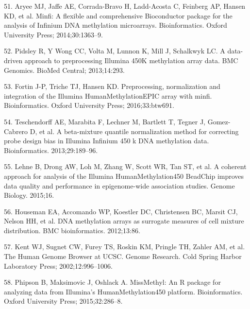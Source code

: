 \documentclass[]{bmcart}
\theoremstyle{definition}
\theoremstyle{definition}
\theoremstyle{definition}
\theoremstyle{remark}
\begin{document}
51. Aryee MJ, Jaffe AE, Corrada-Bravo H, Ladd-Acosta C, Feinberg AP,
Hansen KD, et al. Minfi: A flexible and comprehensive Bioconductor
package for the analysis of Infinium DNA methylation microarrays.
Bioinformatics. Oxford University Press; 2014;30:1363--9.

52. Pidsley R, {Y Wong} CC, Volta M, Lunnon K, Mill J, Schalkwyk LC. A
data-driven approach to preprocessing Illumina 450K methylation array
data. BMC Genomics. BioMed Central; 2013;14:293.

53. Fortin J-P, Triche TJ, Hansen KD. Preprocessing, normalization and
integration of the Illumina HumanMethylationEPIC array with minfi.
Bioinformatics. Oxford University Press; 2016;33:btw691.

54. Teschendorff AE, Marabita F, Lechner M, Bartlett T, Tegner J,
Gomez-Cabrero D, et al. A beta-mixture quantile normalization method for
correcting probe design bias in Illumina Infinium 450 k DNA methylation
data. Bioinformatics. 2013;29:189--96.

55. Lehne B, Drong AW, Loh M, Zhang W, Scott WR, Tan ST, et al. A
coherent approach for analysis of the Illumina HumanMethylation450
BeadChip improves data quality and performance in epigenome-wide
association studies. Genome Biology. 2015;16.

56. Houseman EA, Accomando WP, Koestler DC, Christensen BC, Marsit CJ,
Nelson HH, et al. DNA methylation arrays as surrogate measures of cell
mixture distribution. BMC bioinformatics. 2012;13:86.

57. Kent WJ, Sugnet CW, Furey TS, Roskin KM, Pringle TH, Zahler AM, et
al. The Human Genome Browser at UCSC. Genome Research. Cold Spring
Harbor Laboratory Press; 2002;12:996--1006.

58. Phipson B, Maksimovic J, Oshlack A. MissMethyl: An R package for
analyzing data from Illumina's HumanMethylation450 platform.
Bioinformatics. Oxford University Press; 2015;32:286--8.
\end{document}
